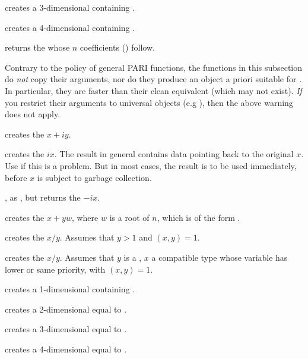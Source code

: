  creates a 3-dimensional
 containing \kbd{[x, y, z]}.

 creates a 4-dimensional
 containing \kbd{[x, y, z, t]}.

 returns the  whose $n$
coefficients () follow.

\label{se:unclean}

Contrary to the policy of general PARI functions, the functions in this
subsection do \emph{not} copy their arguments, nor do they produce an object
a priori suitable for . In particular, they are
faster than their clean equivalent (which may not exist). \emph{If} you
restrict their arguments to universal objects (e.g ),
then the above warning does not apply.

 creates the  $x + iy$.

 creates the  $ix$. The result in
general contains data pointing back to the original $x$. Use  if
this is a problem. But in most cases, the result is to be used immediately,
before $x$ is subject to garbage collection.

, as , but returns the 
$-ix$.

 creates the  $x + yw$,
where $w$ is a root of $n$, which is of the form .

 creates the  $x/y$. Assumes that
$y > 1$ and $(x,y) = 1$.

 creates the  $x/y$. Assumes
that $y$ is a , $x$ a compatible type whose variable has lower
or same priority, with $(x,y) = 1$.

 creates a 1-dimensional  containing .

 creates a 2-dimensional  equal to
\kbd{[x,y]}.

 creates a 3-dimensional 
equal to \kbd{[x,y,z]}.

 creates a 4-dimensional 
equal to \kbd{[x,y,z,t]}.

